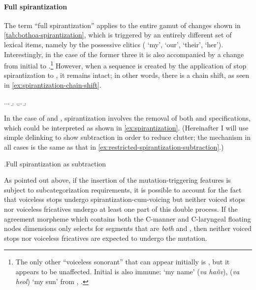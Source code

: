\paragraph{Full spirantization}
\label{sec:full-spirantization}

The term \enquote{full spirantization} applies to the entire gamut of changes shown in \cref{tab:bothoa-spirantization}, which is triggered by an entirely different set of lexical items, namely by the possessive clitics (\ipa{[mə]} `my', \ipa{[om]} `our', \ipa{[o]} `their', \ipa{[i]} `her'). Interestingly, in the case of the former three it is also accompanied by a change from initial \ipa{[hr]} to \ipa{[r]}.\footnote{The only other \enquote{voiceless sonorant} that can appear initially is \ipa{[hj]}, but it appears to be unaffected. Initial \ipa{[h]} is also immune: \ipa{[mə ˈhãw̃n]} `my name' (\emph{va hañv}), \ipa{[mə ˈhjɒːl]} (\emph{va heol}) `my sun' from \ipa{[ˈhãw̃n]}, \ipa{[hjɒːl]}.} However, when a \ipa{[hr]} sequence is created by the application of stop spirantization to \ipa{[k]}, it remains intact; in other words, there is a chain shift, as seen in \cref{ex:spirantization-chain-shift}.

\ex.\label{ex:spirantization-chain-shift}\a.\a.
\b.
\z.\b.\a.
\b.

In the case of \ipa{[p]} and \ipa{[t]}, spirantization involves the removal of both  and  specifications, which could be interpreted as shown in \cref{ex:spirantization}. (Hereinafter I will use simple delinking to show subtraction in order to reduce clutter; the mechanism in all cases is the same as that in \ref{ex:restricted-spirantization-subtraction}.)

\ex.\label{ex:spirantization}Full spirantization as subtraction\\

As pointed out above, if the insertion of the mutation-triggering features is subject to subcategorization requirements, it is possible to account for the fact that voiceless stops undergo spirantization\hyp cum\hyp voicing but neither voiced stops nor voiceless fricatives undergo at least one part of this double process. If the agreement morpheme which contains both the C-manner and C-laryngeal floating nodes dimensions only selects for segments that are \emph{both}  and , then neither voiced stops nor voiceless fricatives are expected to undergo the mutation.

